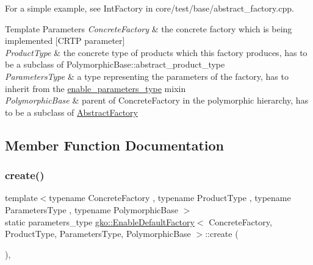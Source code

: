 For a simple example, see Int\+Factory in {\ttfamily core/test/base/abstract\+\_\+factory.\+cpp}.


\begin{DoxyTemplParams}{Template Parameters}
{\em Concrete\+Factory} & the concrete factory which is being implemented \mbox{[}C\+R\+TP parameter\mbox{]} \\
\hline
{\em Product\+Type} & the concrete type of products which this factory produces, has to be a subclass of Polymorphic\+Base\+::abstract\+\_\+product\+\_\+type \\
\hline
{\em Parameters\+Type} & a type representing the parameters of the factory, has to inherit from the \hyperlink{structgko_1_1enable__parameters__type}{enable\+\_\+parameters\+\_\+type} mixin \\
\hline
{\em Polymorphic\+Base} & parent of Concrete\+Factory in the polymorphic hierarchy, has to be a subclass of \hyperlink{classgko_1_1AbstractFactory}{Abstract\+Factory} \\
\hline
\end{DoxyTemplParams}


\subsection{Member Function Documentation}
\mbox{\label{classgko_1_1EnableDefaultFactory_a1d077101d9e788e6c65f088612d14cc3}} 
\subsubsection{\texorpdfstring{create()}{create()}}
{\footnotesize\ttfamily template$<$typename Concrete\+Factory , typename Product\+Type , typename Parameters\+Type , typename Polymorphic\+Base $>$ \\
static parameters\+\_\+type \hyperlink{classgko_1_1EnableDefaultFactory}{gko\+::\+Enable\+Default\+Factory}$<$ Concrete\+Factory, Product\+Type, Parameters\+Type, Polymorphic\+Base $>$\+::create (\begin{DoxyParamCaption}{ }\end{DoxyParamCaption})\hspace{0.3cm}{\ttfamily [inline]}, {\ttfamily [static]}}



